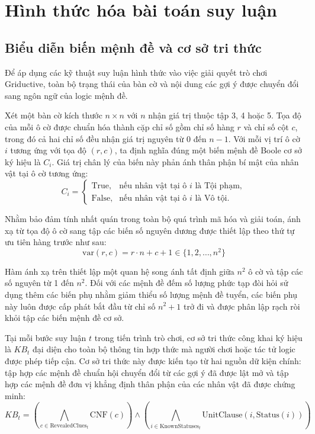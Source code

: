 \chapter{Hình thức hóa bài toán suy luận}
\label{chap:hinh-thuc-hoa}

\section{Biểu diễn biến mệnh đề và cơ sở tri thức}
\label{sec:bien-menh-de-kb}

Để áp dụng các kỹ thuật suy luận hình thức vào việc giải quyết trò chơi Griductive, toàn bộ trạng thái của bàn cờ và nội dung các gợi ý được chuyển đổi sang ngôn ngữ của logic mệnh đề. 

Xét một bàn cờ kích thước $n \times n$ với $n$ nhận giá trị thuộc tập 3, 4 hoặc 5. Tọa độ của mỗi ô cờ được chuẩn hóa thành cặp chỉ số gồm chỉ số hàng $r$ và chỉ số cột $c$, trong đó cả hai chỉ số đều nhận giá trị nguyên từ 0 đến $n - 1$. Với mỗi vị trí ô cờ $i$ tương ứng với tọa độ $(r, c)$, ta định nghĩa đúng một biến mệnh đề Boole cơ sở ký hiệu là $C_i$. Giá trị chân lý của biến này phản ánh thân phận bí mật của nhân vật tại ô cờ tương ứng:
\[
C_i = 
\begin{cases}
\text{True}, & \text{nếu nhân vật tại ô } i \text{ là Tội phạm}, \\
\text{False}, & \text{nếu nhân vật tại ô } i \text{ là Vô tội}.
\end{cases}
\]

Nhằm bảo đảm tính nhất quán trong toàn bộ quá trình mã hóa và giải toán, ánh xạ từ tọa độ ô cờ sang tập các biến số nguyên dương được thiết lập theo thứ tự ưu tiên hàng trước như sau:
\[
\text{var}(r, c) = r \cdot n + c + 1 \in \{1, 2, \dots, n^2\}
\]

Hàm ánh xạ trên thiết lập một quan hệ song ánh tất định giữa $n^2$ ô cờ và tập các số nguyên từ 1 đến $n^2$. Đối với các mệnh đề đếm số lượng phức tạp đòi hỏi sử dụng thêm các biến phụ nhằm giảm thiểu số lượng mệnh đề tuyển, các biến phụ này luôn được cấp phát bắt đầu từ chỉ số $n^2 + 1$ trở đi và được phân lập rạch ròi khỏi tập các biến mệnh đề cơ sở.

Tại mỗi bước suy luận $t$ trong tiến trình trò chơi, cơ sở tri thức công khai ký hiệu là $KB_t$ đại diện cho toàn bộ thông tin hợp thức mà người chơi hoặc tác tử logic được phép tiếp cận. Cơ sở tri thức này được kiến tạo từ hai nguồn dữ kiện chính: tập hợp các mệnh đề chuẩn hội chuyển đổi từ các gợi ý đã được lật mở và tập hợp các mệnh đề đơn vị khẳng định thân phận của các nhân vật đã được chứng minh:
\[
KB_t = \left( \bigwedge_{c \in \text{RevealedClues}_t} \text{CNF}(c) \right) \land \left( \bigwedge_{i \in \text{KnownStatuses}_t} \text{UnitClause}(i, \text{Status}(i)) \right)
\]


